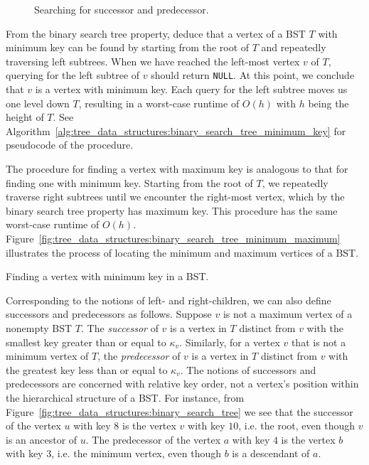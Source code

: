 \begin{figure}[!htbp]
\centering

\caption{Searching for successor and predecessor.}
\label{fig:tree_data_structures:binary_search_tree_successor_predecessor}
\end{figure}

From the binary search tree property, deduce that a vertex of a BST
$T$ with minimum key can be found by starting from the root of $T$ and
repeatedly traversing left subtrees. When we have reached the
left-most vertex $v$ of $T$, querying for the left subtree of $v$
should return \texttt{NULL}. At this point, we conclude that $v$ is a
vertex with minimum key. Each query for the left subtree moves us one
level down $T$, resulting in a worst-case runtime of $O(h)$ with $h$
being the height of $T$. See
Algorithm~\ref{alg:tree_data_structures:binary_search_tree_minimum_key}
for pseudocode of the procedure.

The procedure for finding a vertex with maximum key is analogous to
that for finding one with minimum key. Starting from the root of $T$,
we repeatedly traverse right subtrees until we encounter the
right-most vertex, which by the binary search tree property has
maximum key. This procedure has the same worst-case runtime of $O(h)$.
Figure~\ref{fig:tree_data_structures:binary_search_tree_minimum_maximum}
illustrates the process of locating the minimum and maximum vertices
of a BST.

\begin{algorithm}[!htbp]

\caption{Finding a vertex with minimum key in a BST.}
\label{alg:tree_data_structures:binary_search_tree_minimum_key}
\end{algorithm}

Corresponding to the notions of left- and right-children, we can also
define successors and predecessors as follows. Suppose $v$ is not a
maximum vertex of a nonempty BST $T$. The \emph{successor} of $v$ is a
vertex in $T$ distinct from $v$ with the smallest key greater than or
equal to $\kappa_v$. Similarly, for a vertex $v$ that is not a minimum
vertex of $T$, the \emph{predecessor} of $v$ is a vertex in $T$
distinct from $v$ with the greatest key less than or equal to
$\kappa_v$. The notions of successors and predecessors are concerned
with relative key order, not a vertex's position within the
hierarchical structure of a BST. For instance, from
Figure~\ref{fig:tree_data_structures:binary_search_tree} we see that
the successor of the vertex $u$ with key $8$ is the vertex $v$ with
key $10$, i.e. the root, even though $v$ is an ancestor of $u$. The
predecessor of the vertex $a$ with key $4$ is the vertex $b$ with key
$3$, i.e. the minimum vertex, even though $b$ is a descendant of $a$.

